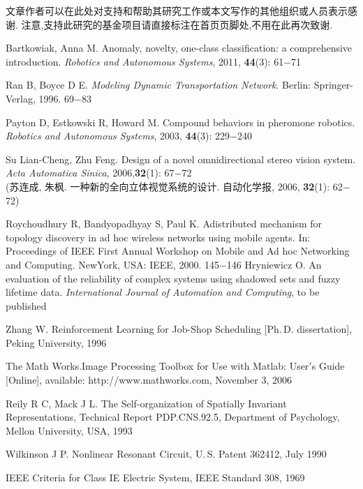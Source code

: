 \documentclass{Style/aas}
\begin{document}
\begin{multicols}{2}
  文章作者可以在此处对支持和帮助其研究工作或本文写作的其他组织或人员表示感谢.
  注意,支持此研究的基金项目请直接标注在首页页脚处,不用在此再次致谢.

  \begin{thebibliography}{99}
     \addtolength{\itemsep}{0.2em} 
     Bartkowiak, Anna M. Anomaly, novelty, one-class classification: a comprehensive introduction. {\sl Robotics and Autonomous Systems}, 2011, {\bf 44}(3): 61$-$71


     Ran B, Boyce D E. {\sl Modeling Dynamic Transportation Network}.
    Berlin: Springer-Verlag, 1996. 69$-$83

     Payton D, Estkowski R, Howard M. Compound behaviors in pheromone robotics. {\sl Robotics and Autonomous Systems}, 2003, {\bf 44}(3): 229$-$240

     Su Lian-Cheng, Zhu Feng. Design of a novel omnidirectional stereo vision system. {\sl  Acta Automatica Sinica}, 2006,{\bf 32}(1): 67$-$72\\ (苏连成, 朱枫. 一种新的全向立体视觉系统的设计. 自动化学报, 2006, {\bf 32}(1): 62$-$72)

     Roychoudhury R, Bandyopadhyay S, Paul K. Adistributed mechanism for topology discovery in ad hoc wireless networks using mobile agents. In: Proceedings of IEEE First Annual Workshop on Mobile and Ad hoc Networking and Computing. NewYork, USA: IEEE, 2000. 145$-$146
     Hryniewicz O. An evaluation of the reliability of complex systems using shadowed sets and fuzzy lifetime data. {\sl International Journal of Automation and Computing}, to be published

     Zhang W. Reinforcement Learning for Job-Shop Scheduling [Ph.\,D.
        dissertation], Peking University, 1996

     The Math Works.Image Processing Toolbox for Use with Matlab: User$'$s Guide [Online], available: http://www.mathworks.com, November 3, 2006

     Reily R C, Mack J L. The Self-organization of Spatially Invariant
    Representations, Technical Report PDP.CNS.92.5, Department of
    Psychology, Mellon University, USA, 1993

     Wilkinson J P. Nonlinear Resonant Circuit, U.\,S. Patent 362412, July 1990

     IEEE Criteria for Class IE Electric System, IEEE Standard 308, 1969


\end{thebibliography}
\end{multicols}
\end{document}
